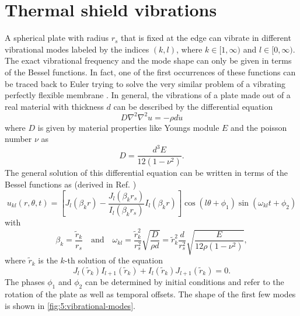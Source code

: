 \section{Thermal shield vibrations}\label{sec:5:thermal-vibrations}
A spherical plate with radius $r_s$ that is fixed at the edge can vibrate in different vibrational modes labeled by the indices $(k,l)$, where $k \in [1,\infty)$ and $l \in [0, \infty)$.
The exact vibrational frequency and the mode shape can only be given in terms of the Bessel functions. In fact, one of the first occurrences of these functions can be traced back to Euler trying to solve the very similar problem of a vibrating perfectly flexible membrane \cite{Dutka_1995}.
In general, the vibrations of a plate made out of a real material with thickness $d$ can be described by the differential equation \cite[p. 490]{Rao_2019}
\begin{equation}
  D \nabla^2\nabla^2 u = -\rho d \ddot{u}
\end{equation} 
where $D$ is given by material properties like Youngs module $E$ and the poisson number $\nu$ as
\begin{equation}
  D = \frac{d^3 E}{12(1-\nu^2)} .
\end{equation}
The general solution of this differential equation can be written in terms of the Bessel functions as (derived in Ref. \cite[p. 490-495]{Rao_2019}) 
\begin{equation}
  u_{kl}(r, \theta, t) = \left[J_l(\beta_k r) - \frac{J_l(\beta_k r_s)}{I_l(\beta_k r_s)}I_l(\beta_k r)\right]\cos(l\theta+\phi_1)\sin(\omega_{kl}t+\phi_2)
\end{equation}
with
\begin{equation} \label{eq:5:vibration-frequency}
  \beta_k = \frac{\tilde{r}_k}{r_s} \quad \text{and} \quad \omega_{kl} = \frac{\tilde{r}_k^2}{r_s^2}\sqrt{\frac{D}{\rho d}} = \tilde{r}_k^2\frac{d}{r_s^2}\sqrt{\frac{E}{12\rho(1-\nu^2)}} ,
\end{equation}
where $\tilde{r}_k$ is the $k$-th solution of the equation
\begin{equation}\label{eq:5:bessel-zeros}
  J_l(\tilde{r}_k)I_{l+1}(\tilde{r}_k)+I_l(\tilde{r}_k)J_{l+1}(\tilde{r}_k) = 0 .
\end{equation}
The phases $\phi_1$ and $\phi_2$ can be determined by initial conditions and refer to the rotation of the plate as well as temporal offsets. The shape of the first few modes is shown in \cref{fig:5:vibrational-modes}.
